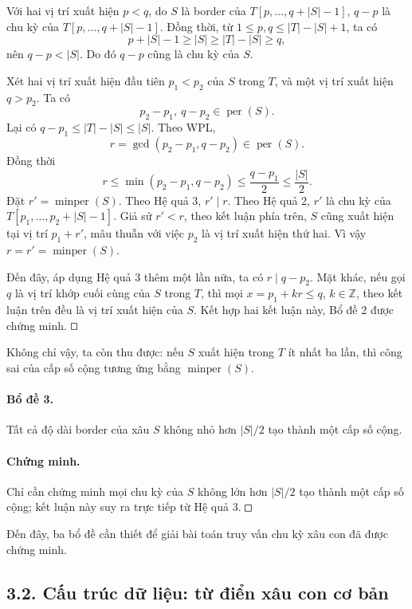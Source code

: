 \documentclass[11pt]{article}
\newcommand{\square}{\mathord{\vcenter{\hrule height .5pt
  \hbox{\vrule width .5pt height 5pt\kern5pt\vrule width .5pt}
  \hrule height .5pt}}}
\begin{document}
Với hai vị trí xuất hiện \(p<q\), do \(S\) là border của
\(T[p,\ldots,q+|S|-1]\), \(q-p\) là chu kỳ của \(T[p,\ldots,q+|S|-1]\). Đồng
thời, từ \(1\le p,q\le |T|-|S|+1\), ta có
\[
  p+|S|-1\ge |S|\ge |T|-|S|\ge q,
\]
nên \(q-p<|S|\). Do đó \(q-p\) cũng là chu kỳ của \(S\).

Xét hai vị trí xuất hiện đầu tiên \(p_1<p_2\) của \(S\) trong \(T\), và một vị
trí xuất hiện \(q>p_2\). Ta có
\[
  p_2-p_1,\ q-p_2\in\operatorname{per}(S).
\]
Lại có \(q-p_1\le |T|-|S|\le |S|\). Theo WPL,
\[
  r=\gcd(p_2-p_1,q-p_2)\in\operatorname{per}(S).
\]
Đồng thời
\[
  r\le \min(p_2-p_1,q-p_2)\le \frac{q-p_1}{2}\le \frac{|S|}{2}.
\]
Đặt \(r'=\operatorname{minper}(S)\). Theo Hệ quả 3, \(r'\mid r\). Theo Hệ quả
2, \(r'\) là chu kỳ của \(T[p_1,\ldots,p_2+|S|-1]\). Giả sử \(r'<r\), theo kết
luận phía trên, \(S\) cũng xuất hiện tại vị trí \(p_1+r'\), mâu thuẫn với việc
\(p_2\) là vị trí xuất hiện thứ hai. Vì vậy \(r=r'=\operatorname{minper}(S)\).

Đến đây, áp dụng Hệ quả 3 thêm một lần nữa, ta có \(r\mid q-p_2\). Mặt khác,
nếu gọi \(q\) là vị trí khớp cuối cùng của \(S\) trong \(T\), thì mọi
\(x=p_1+kr\le q\), \(k\in\mathbb Z\), theo kết luận trên đều là vị trí xuất
hiện của \(S\). Kết hợp hai kết luận này, Bổ đề 2 được chứng minh. \(\square\)

Không chỉ vậy, ta còn thu được: nếu \(S\) xuất hiện trong \(T\) ít nhất ba lần,
thì công sai của cấp số cộng tương ứng bằng \(\operatorname{minper}(S)\).

\paragraph{Bổ đề 3.}
Tất cả độ dài border của xâu \(S\) không nhỏ hơn \(|S|/2\) tạo thành một cấp số
cộng.

\paragraph{Chứng minh.}
Chỉ cần chứng minh mọi chu kỳ của \(S\) không lớn hơn \(|S|/2\) tạo thành một
cấp số cộng; kết luận này suy ra trực tiếp từ Hệ quả 3. \(\square\)

Đến đây, ba bổ đề cần thiết để giải bài toán truy vấn chu kỳ xâu con đã được
chứng minh.

\subsection*{3.2. Cấu trúc dữ liệu: từ điển xâu con cơ bản}
\end{document}
